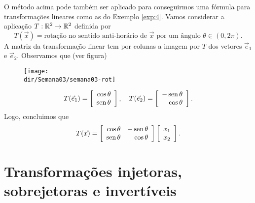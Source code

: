 \documentclass[../livro.tex]{subfiles}
\providecommand{\dir}{..}
\begin{document}
\begin{example}\label{exp:rotacao}
O método acima pode também ser aplicado para conseguirmos uma fórmula para transformações lineares como as do Exemplo \ref{exp:4}. Vamos considerar a aplicação $T: \mathbb{R}^2 \to \mathbb{R}^2$ definida por
\begin{equation}
T(\vec{x}) = \text{rotação no sentido anti-horário de $\vec{x}$ por um ângulo } \theta \in (0, 2\pi).
\end{equation} A matriz da transformação linear tem por colunas a imagem por $T$ dos vetores $\vec{e}_1$ e $\vec{e}_2$. Observamos que (ver figura)
\begin{figure}[h!]
\begin{center}
\texttt{[image: \\dir/Semana03/semana03-rot]}
\end{center}
\end{figure}
\begin{equation}
T(\vec{e}_1) =
\left[
  \begin{array}{r}
    \cos \theta \\
    \operatorname{sen} \theta \\
  \end{array}
\right], \quad T(\vec{e}_2) =
\left[
  \begin{array}{r}
    - \operatorname{sen} \theta \\
    \cos \theta \\
  \end{array}
\right].
\end{equation} Logo, concluimos que
\begin{equation}
T(\vec{x}) = \left[
  \begin{array}{rr}
    \cos \theta  & - \operatorname{sen} \theta \\
    \operatorname{sen} \theta  & \cos \theta \\
  \end{array}
\right]
\left[
  \begin{array}{r}
    x_1 \\
    x_2 \\
  \end{array}
\right].
\end{equation}
\end{example}



\section{Transformações injetoras, sobrejetoras e invertíveis}
\end{document}
